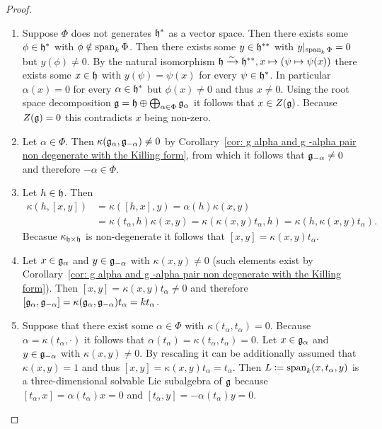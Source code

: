 \begin{proof}
 \begin{enumerate}[leftmargin=*]
  \item
   Suppose $\Phi$ does not generates $\mathfrak{h}^*$ as a vector space. Then there exists some $\phi \in \mathfrak{h}^*$ with $\phi \notin \operatorname{span}_k \Phi$. Then there exists some $y \in \mathfrak{h}^{**}$ with $y|_{\operatorname{span}_k \Phi} = 0$ but $y(\phi) \neq 0$. By the natural isomorphism $\mathfrak{h} \xrightarrow{\sim} \mathfrak{h}^{**}, x \mapsto (\psi \mapsto \psi(x))$ there exists some $x \in \mathfrak{h}$ with $y(\psi) = \psi(x)$ for every $\psi \in \mathfrak{h}^*$. In particular $\alpha(x) = 0$ for every $\alpha \in \mathfrak{h}^*$ but $\phi(x) \neq 0$ and thus $x \neq 0$. Using the root space decomposition $\mathfrak{g} = \mathfrak{h} \oplus \bigoplus_{\alpha \in \Phi} \mathfrak{g}_\alpha$ it follows that $x \in Z(\mathfrak{g})$. Because $Z(\mathfrak{g}) = 0$ this contradicts $x$ being non-zero.
   
  \item
  Let $\alpha \in \Phi$. Then $\kappa(\mathfrak{g}_\alpha, \mathfrak{g}_{-\alpha}) \neq 0$ by Corollary~\ref{cor: g alpha and g -alpha pair non degenerate with the Killing form}, from which it follows that $\mathfrak{g}_{-\alpha} \neq 0$ and therefore $-\alpha \in \Phi$.
   
  \item
   Let $h \in \mathfrak{h}$. Then
   \begin{align*}
    \kappa(h, [x,y])
    &= \kappa([h,x], y)
    = \alpha(h) \kappa(x,y) \\
    &= \kappa(t_\alpha, h) \kappa(x,y)
    = \kappa(\kappa(x,y) t_\alpha, h)
    = \kappa(h, \kappa(x,y) t_\alpha).
   \end{align*}
   Becasue $\kappa_{\mathfrak{h} \times \mathfrak{h}}$ is non-degenerate it follows that $[x,y] = \kappa(x,y) t_\alpha$.
   
  \item
   Let $x \in \mathfrak{g}_\alpha$ and $y \in \mathfrak{g}_{-\alpha}$ with $\kappa(x,y) \neq 0$ (such elements exist by Corollary~\ref{cor: g alpha and g -alpha pair non degenerate with the Killing form}). Then $[x,y] = \kappa(x,y) t_\alpha \neq 0$ and therefore $[\mathfrak{g}_\alpha, \mathfrak{g}_{-\alpha}] = \kappa(\mathfrak{g}_\alpha, \mathfrak{g}_{-\alpha}) t_\alpha = k t_\alpha$.
   
  \item
   Suppose that there exist some $\alpha \in \Phi$ with $\kappa(t_\alpha, t_\alpha) = 0$. Because $\alpha = \kappa(t_\alpha, \cdot)$ it follows that $\alpha(t_\alpha) = \kappa(t_\alpha, t_\alpha) = 0$. Let $x \in \mathfrak{g}_\alpha$ and $y \in \mathfrak{g}_{-\alpha}$ with $\kappa(x,y) \neq 0$. By rescaling it can be additionally assumed that $\kappa(x,y) = 1$ and thus $[x,y] = \kappa(x,y) t_\alpha = t_\alpha$. Then $L \coloneqq \operatorname{span}_k(x,t_\alpha,y)$ is a three-dimensional solvable Lie subalgebra of $\mathfrak{g}$ because $[t_\alpha, x] = \alpha(t_\alpha)x = 0$ and $[t_\alpha, y] = -\alpha(t_\alpha)y = 0$.
   

\end{enumerate}
\end{proof}
